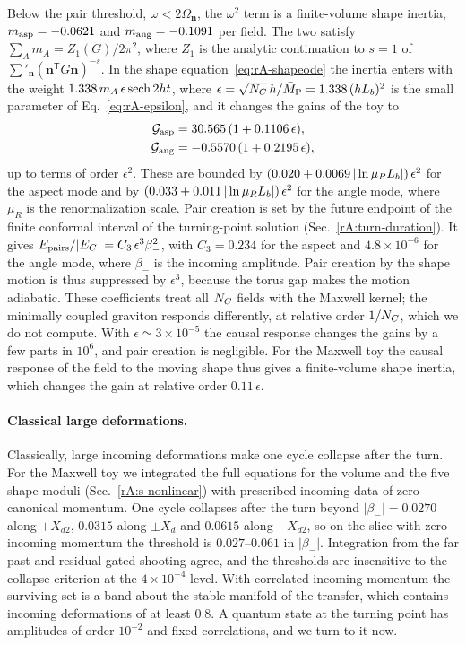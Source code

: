 Below the pair threshold, $\omega<2\Omega_{\bm n}$, the $\omega^2$ term is a finite-volume shape inertia, $m_{\rm asp}=-0.0621$ and $m_{\rm ang}=-0.1091$ per field. %
The two satisfy $\sum_Am_A=Z_1(G)/2\pi^2$, where $Z_1$ is the analytic continuation to $s=1$ of $\sum'_{\bm n}(\bm n^{\mathsf T}G\bm n)^{-s}$.
In the shape equation~\eqref{eq:rA-shapeode} the inertia enters with the weight $1.338\,m_A\,\epsilon\,{\rm sech}\,2ht$, where $\epsilon=\sqrt{N_C}\,h/\bar M_{\mathrm{P}}=1.338\,(hL_b)^2$ is the small parameter of Eq.~\eqref{eq:rA-epsilon}, and it changes the gains of the toy to %
\begin{equation}
\begin{aligned}
\mathcal{G}_{\rm asp}&=30.565\,(1+0.1106\,\epsilon),\\
\mathcal{G}_{\rm ang}&=-0.5570\,(1+0.2195\,\epsilon),
\end{aligned}
\label{eq:rA-causal-gains}
\end{equation} %
up to terms of order $\epsilon^2$.
These are bounded by $(0.020+0.0069\,|\ln\mu_RL_b|)\,\epsilon^2$ for the aspect mode and by $(0.033+0.011\,|\ln\mu_RL_b|)\,\epsilon^2$ for the angle mode, where $\mu_R$ is the renormalization scale. %
Pair creation is set by the future endpoint of the finite conformal interval of the turning-point solution (Sec.~\ref{rA:turn-duration}).
It gives $E_{\rm pairs}/|E_C|=C_3\,\epsilon^3\beta_-^2$, with $C_3=0.234$ for the aspect and $4.8\times10^{-6}$ for the angle mode, where $\beta_-$ is the incoming amplitude. %
Pair creation by the shape motion is thus suppressed by $\epsilon^3$, because the torus gap makes the motion adiabatic.
These coefficients treat all $N_C$ fields with the Maxwell kernel; the minimally coupled graviton responds differently, at relative order $1/N_C$, which we do not compute.
With $\epsilon\simeq3\times10^{-5}$ the causal response changes the gains by a few parts in $10^6$, and pair creation is negligible. %
For the Maxwell toy the causal response of the field to the moving shape thus gives a finite-volume shape inertia, which changes the gain at relative order $0.11\,\epsilon$. %

\paragraph{Classical large deformations.}
Classically, large incoming deformations make one cycle collapse after the turn.
For the Maxwell toy we integrated the full equations for the volume and the five shape moduli (Sec.~\ref{rA:s-nonlinear}) with prescribed incoming data of zero canonical momentum.
One cycle collapses after the turn beyond $|\beta_-|=0.0270$ along $+X_{d2}$, $0.0315$ along $\pm X_d$ and $0.0615$ along $-X_{d2}$, so on the slice with zero incoming momentum the threshold is $0.027$--$0.061$ in $|\beta_-|$. %
Integration from the far past and residual-gated shooting agree, and the thresholds are insensitive to the collapse criterion at the $4\times10^{-4}$ level. %
With correlated incoming momentum the surviving set is a band about the stable manifold of the transfer, which contains incoming deformations of at least $0.8$. %
A quantum state at the turning point has amplitudes of order $10^{-2}$ and fixed correlations, and we turn to it now. %
